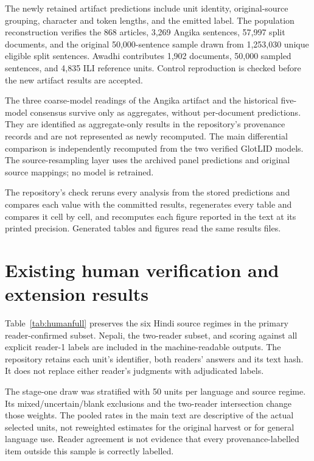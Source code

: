 \documentclass[final]{clv2025}
\newcommand{\fitexhibit}[1]{\sbox{\exhibitbox}{}\ifdim\wd\exhibitbox>\linewidth\resizebox{\linewidth}{!}{\usebox{\exhibitbox}}\else\usebox{\exhibitbox}\fi}
\newcommand{\exhibit}[1]{\fitexhibit{tables/#1.tex}}
\begin{document}
The newly retained artifact predictions include unit identity, original-source grouping, character and token lengths, and the emitted label. The population reconstruction verifies the 868 articles, 3,269 Angika sentences, 57,997 split documents, and the original 50,000-sentence sample drawn from 1,253,030 unique eligible split sentences. Awadhi contributes 1,902 documents, 50,000 sampled sentences, and 4,835 ILI reference units. Control reproduction is checked before the new artifact results are accepted.

The three coarse-model readings of the Angika artifact and the historical five-model consensus survive only as aggregates, without per-document predictions. They are identified as aggregate-only results in the repository's provenance records and are not represented as newly recomputed. The main differential comparison is independently recomputed from the two verified GlotLID models. The source-resampling layer uses the archived panel predictions and original source mappings; no model is retrained.

The repository's check reruns every analysis from the stored predictions and compares each value with the committed results, regenerates every table and compares it cell by cell, and recomputes each figure reported in the text at its printed precision. Generated tables and figures read the same results files.

\FloatBarrier
\section{Existing human verification and extension results}\label{app:human}

Table~\ref{tab:humanfull} preserves the six Hindi source regimes in the primary reader-confirmed subset. Nepali, the two-reader subset, and scoring against all explicit reader-1 labels are included in the machine-readable outputs. The repository retains each unit's identifier, both readers' answers and its text hash. It does not replace either reader's judgments with adjudicated labels.

\begin{table}[htbp]\centering\small\exhibit{human_domains}
\caption{Hindi retention on provenance labels confirmed by reader 1. All three GlotLID releases receive identical texts.}\label{tab:humanfull}
\end{table}

The stage-one draw was stratified with 50 units per language and source regime. Its mixed/uncertain/blank exclusions and the two-reader intersection change those weights. The pooled rates in the main text are descriptive of the actual selected units, not reweighted estimates for the original harvest or for general language use. Reader agreement is not evidence that every provenance-labelled item outside this sample is correctly labelled.
\end{document}
